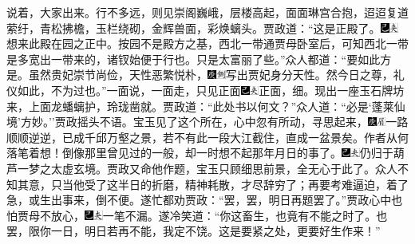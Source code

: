 说着，大家出来。行不多远，则见崇阁巍峨，层楼高起，面面琳宫合抱，迢迢复道萦纡，青松拂檐，玉栏绕砌，金辉兽面，彩焕螭头。贾政道：``这是正殿了。{\includegraphics[width=3mm]{../Images/00003}\includegraphics[width=3mm]{../Images/00012}\footnotesize \kaishu 想来此殿在园之正中。按园不是殿方之基，西北一带通贾母卧室后，可知西北一带是多宽出一带来的，诸钗始便于行也。}只是太富丽了些。''众人都道：``要如此方是。虽然贵妃崇节尚俭，天性恶繁悦朴，{\includegraphics[width=3mm]{../Images/00004}\includegraphics[width=3mm]{../Images/00011}\footnotesize \kaishu 写出贾妃身分天性。}然今日之尊，礼仪如此，不为过也。''一面说，一面走，只见正面{\includegraphics[width=3mm]{../Images/00003}\includegraphics[width=3mm]{../Images/00012}\footnotesize \kaishu 正面，细。}现出一座玉石牌坊来，上面龙蟠螭护，玲珑凿就。贾政道：``此处书以何文？''众人道：``必是`蓬莱仙境'方妙。''贾政摇头不语。宝玉见了这个所在，心中忽有所动，寻思起来，{\includegraphics[width=3mm]{../Images/00004}\includegraphics[width=3mm]{../Images/00010}\footnotesize \kaishu 一路顺顺逆逆，已成千邱万壑之景，若不有此一段大江截住，直成一盆景矣。作者从何落笔着想！}倒像那里曾见过的一般，却一时想不起那年月日的事了。{\includegraphics[width=3mm]{../Images/00003}\includegraphics[width=3mm]{../Images/00012}\footnotesize \kaishu 仍归于葫芦一梦之太虚玄境。}贾政又命他作题，宝玉只顾细思前景，全无心于此了。众人不知其意，只当他受了这半日的折磨，精神耗散，才尽辞穷了；再要考难逼迫，着了急，或生出事来，倒不便。遂忙都劝贾政：``罢，罢，明日再题罢了。''贾政心中也怕贾母不放心，{\includegraphics[width=3mm]{../Images/00003}\includegraphics[width=3mm]{../Images/00012}\footnotesize \kaishu 一笔不漏。}遂冷笑道：``你这畜生，也竟有不能之时了。也罢，限你一日，明日若再不能，我定不饶。这是要紧之处，更要好生作来！''

